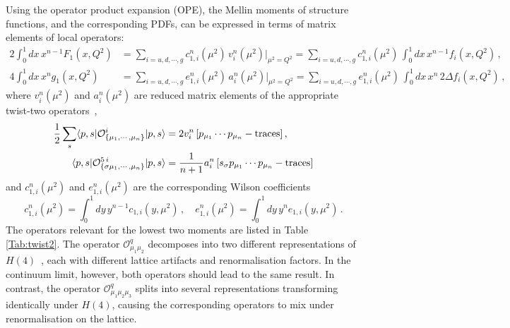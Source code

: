 Using the operator product expansion (OPE), the Mellin moments of structure functions, and the corresponding PDFs, can be expressed in terms of matrix elements of local operators:
\begin{align}
2 \int_0^1 dx\, x^{n-1} F_1(x,Q^2) &= \sum_{i=u,d, \cdots, g} c_{1,i}^n(\mu^2)\, v_i^n(\mu^2)|_{\mu^2=Q^2} = \sum_{i=u,d, \cdots, g} c_{1,i}^n(\mu^2)\, \int_0^1 dx\, x^{n-1} f_i(x,Q^2)\,,\\
4 \int_0^1 dx\, x^n g_1(x,Q^2) &= \sum_{i=u,d, \cdots, g} e_{1,i}^n(\mu^2)\, a_i^n(\mu^2)|_{\mu^2=Q^2} = \sum_{i=u,d, \cdots, g} e_{1,i}^n(\mu^2)\, \int_0^1 dx\, x^n\, 2 \Delta f_i(x,Q^2) \,,
\end{align}
where $v_i^n(\mu^2)$ and $a_i^n(\mu^2)$ are reduced matrix elements of the appropriate twist-two operators~\cite{Gockeler:1995wg},
\begin{equation}
\begin{split}
\frac{1}{2} \sum_s \langle p,s|\mathcal{O}^i_{\{\mu_1,\cdots,\mu_n\}}|p,s\rangle &= 2 v_i^n\, [p_{\mu_1}\cdots p_{\mu_n} - {\rm traces}] \,, \\
\langle p,s|\mathcal{O}^{5\,i}_{\{\sigma \mu_1,\cdots,\mu_n\}}|p,s\rangle &= \frac{1}{n+1} a_i^n\, [s_\sigma p_{\mu_1}\cdots p_{\mu_n} - {\rm traces}] \\
\end{split}
\end{equation}
and $c_{1,i}^n(\mu^2)$ and $e_{1,i}^n(\mu^2)$ are the corresponding Wilson coefficients
\begin{equation}
c_{1,i}^n(\mu^2) = \int_0^1 dy\, y^{n-1} c_{1,i}(y,\mu^2)\,, \quad
e_{1,i}^n(\mu^2) = \int_0^1 dy\, y^n e_{1,i}(y,\mu^2)\,.
\end{equation}
The operators relevant for the lowest two moments are listed in Table \ref{Tab:twist2}. The operator $\mathcal{O}^q_{\mu_1\mu_2}$ decomposes into two different representations of $H(4)$~\cite{Gockeler:1996mu}, each with different lattice artifacts and renormalisation factors. In the continuum limit, however, both operators should lead to the same result. In contrast, the operator $\mathcal{O}^q_{\mu_1\mu_2\mu_3}$ splits into several representations transforming identically under $H(4)$, causing the corresponding operators to mix under renormalisation on the lattice.
